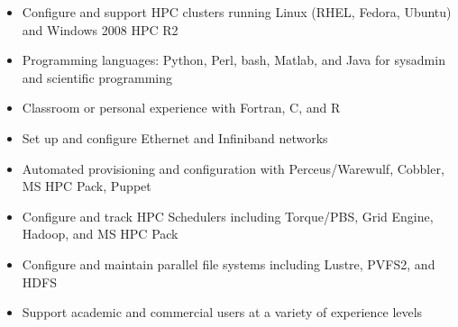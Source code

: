 \documentclass[11pt]{article}
\begin{document}
\begin{itemize}\setlength{\itemsep}{0cm}
\setlength{\parskip}{0cm}

\item Configure and support HPC clusters running Linux (RHEL, Fedora, Ubuntu) and Windows 2008 HPC R2
\item Programming languages: Python, Perl, bash, Matlab, and Java for sysadmin and scientific programming
\item Classroom or personal experience with Fortran, C, and R
\item Set up and configure Ethernet and Infiniband networks
\item Automated provisioning and configuration with Perceus/Warewulf, Cobbler, MS HPC Pack, Puppet
\item Configure and track HPC Schedulers including Torque/PBS, Grid Engine, Hadoop, and MS HPC Pack
\item Configure and maintain parallel file systems including Lustre, PVFS2, and HDFS
\item Support academic and commercial users at a variety of experience levels
%
%

\end{itemize}
\end{document}
